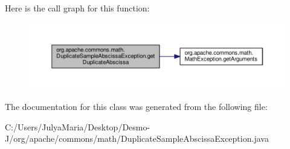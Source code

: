 Here is the call graph for this function\-:
\nopagebreak
\begin{figure}[H]
\begin{center}
\leavevmode
\includegraphics[width=350pt]{classorg_1_1apache_1_1commons_1_1math_1_1_duplicate_sample_abscissa_exception_abf8421a39366eadaa54490d5506de297_cgraph}
\end{center}
\end{figure}




The documentation for this class was generated from the following file\-:\begin{DoxyCompactItemize}
\item 
C\-:/\-Users/\-Julya\-Maria/\-Desktop/\-Desmo-\/\-J/org/apache/commons/math/Duplicate\-Sample\-Abscissa\-Exception.\-java\end{DoxyCompactItemize}
